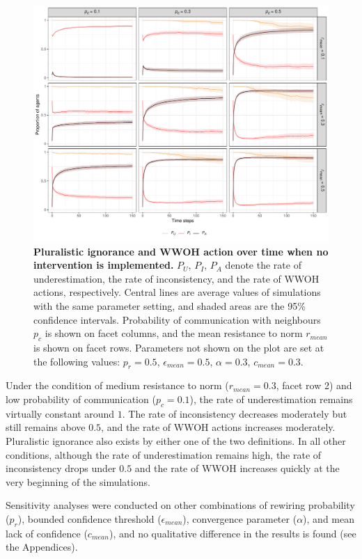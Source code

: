 \documentclass[
  11pt,
]{article}
\begin{document}
\begin{figure}[h]
  \centering
  \includegraphics[width=1\columnwidth]{./figures/factor_for_pi.pdf}
  \caption{\textbf{Pluralistic ignorance and WWOH action over time when no intervention is implemented.} $P_U$, $P_I$, $P_A$ denote the rate of underestimation, the rate of inconsistency, and the rate of WWOH actions, respectively. Central lines are average values of simulations with the same parameter setting, and shaded areas are the 95\% confidence intervals. Probability of communication with neighbours $p_c$ is shown on facet columns, and the mean resistance to norm $r_{mean}$ is shown on facet rows. Parameters not shown on the plot are set at the following values: $p_r = 0.5$, $\epsilon_{mean} = 0.5$, $\alpha = 0.3$, $c_{mean} = 0.3$.}
  \label{fig:2}
\end{figure}

Under the condition of medium resistance to norm (\(r_{mean} = 0.3\),
facet row 2) and low probability of communication (\(p_c = 0.1\)), the
rate of underestimation remains virtually constant around \(1\). The
rate of inconsistency decreases moderately but still remains above
\(0.5\), and the rate of WWOH actions increases moderately. Pluralistic
ignorance also exists by either one of the two definitions. In all other
conditions, although the rate of underestimation remains high, the rate
of inconsistency drops under \(0.5\) and the rate of WWOH increases
quickly at the very beginning of the simulations.

Sensitivity analyses were conducted on other combinations of rewiring
probability (\(p_r\)), bounded confidence threshold
(\(\epsilon_{mean}\)), convergence parameter (\(\alpha\)), and mean lack
of confidence (\(c_{mean}\)), and no qualitative difference in the
results is found (see the Appendices).
\end{document}
